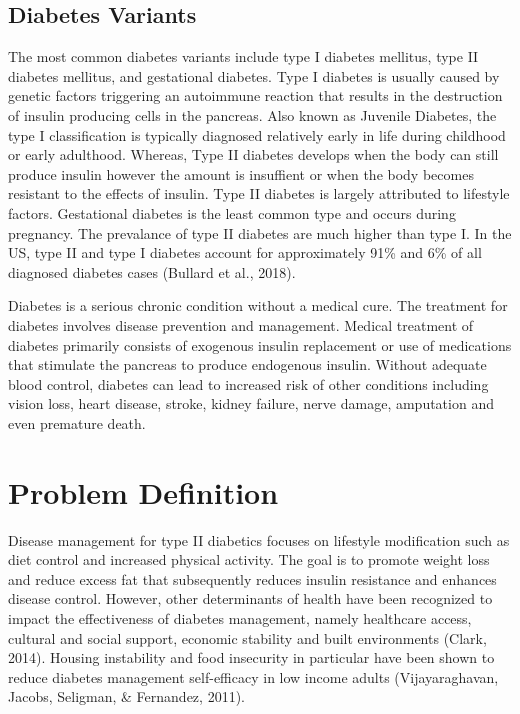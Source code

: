 \documentclass [11pt, proquest] {uwthesis}[2015/03/03]
\begin{document}
\subsection{Diabetes Variants}\label{diabetes-variants}

The most common diabetes variants include type I diabetes mellitus, type
II diabetes mellitus, and gestational diabetes. Type I diabetes is
usually caused by genetic factors triggering an autoimmune reaction that
results in the destruction of insulin producing cells in the pancreas.
Also known as Juvenile Diabetes, the type I classification is typically
diagnosed relatively early in life during childhood or early adulthood.
Whereas, Type II diabetes develops when the body can still produce
insulin however the amount is insuffient or when the body becomes
resistant to the effects of insulin. Type II diabetes is largely
attributed to lifestyle factors. Gestational diabetes is the least
common type and occurs during pregnancy. The prevalance of type II
diabetes are much higher than type I. In the US, type II and type I
diabetes account for approximately 91\% and 6\% of all diagnosed
diabetes cases (Bullard et al., 2018).

Diabetes is a serious chronic condition without a medical cure. The
treatment for diabetes involves disease prevention and management.
Medical treatment of diabetes primarily consists of exogenous insulin
replacement or use of medications that stimulate the pancreas to produce
endogenous insulin. Without adequate blood control, diabetes can lead to
increased risk of other conditions including vision loss, heart disease,
stroke, kidney failure, nerve damage, amputation and even premature
death.

\section{Problem Definition}\label{problem-definition}

Disease management for type II diabetics focuses on lifestyle
modification such as diet control and increased physical activity. The
goal is to promote weight loss and reduce excess fat that subsequently
reduces insulin resistance and enhances disease control. However, other
determinants of health have been recognized to impact the effectiveness
of diabetes management, namely healthcare access, cultural and social
support, economic stability and built environments (Clark, 2014).
Housing instability and food insecurity in particular have been shown to
reduce diabetes management self-efficacy in low income adults
(Vijayaraghavan, Jacobs, Seligman, \& Fernandez, 2011).
\end{document}
